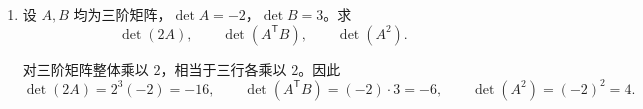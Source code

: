 \documentclass[UTF8,12pt,a4paper,fontset=fandol]{ctexart}
\begin{document}
\begin{enumerate}[label=\arabic*.,series=detquestions]
\begin{solve}
(2) 错误。例如
\[
A=\begin{pmatrix}1&0&1\\0&1&1\\1&1&2\end{pmatrix}
\]
的第三行是前两行之和，故行列式为零，但任意两行均不成比例。

(3) 正确。由乘法公式与转置性质，
$\det(A^{\mathsf T}A)=\det(A^{\mathsf T})\det A=(\det A)^2\geq0$。
这里使用了 $\det A$ 为实数。
\end{solve}

\item\label{q:product-scaling}
设 $A,B$ 均为三阶矩阵，$\det A=-2$，$\det B=3$。求
\[
\det(2A),\qquad \det(A^{\mathsf T}B),\qquad \det(A^2).
\]
\begin{solve}
对三阶矩阵整体乘以 $2$，相当于三行各乘以 $2$。因此
\[
\det(2A)=2^3(-2)=-16,\qquad
\det(A^{\mathsf T}B)=(-2)\cdot3=-6,\qquad
\det(A^2)=(-2)^2=4.
\]
\end{solve}
\end{enumerate}
\end{document}
